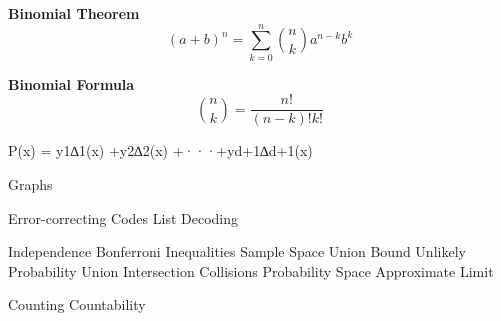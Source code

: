 \documentclass{article}\usepackage{amsmath,amssymb,amsthm,tikz,tkz-graph,color,chngpage,soul,hyperref,csquotes,graphicx,floatrow, listings,polynom}\newcommand*{\QEDB}{\hfill\ensuremath{\square}}\newtheorem*{prop}{Proposition}\renewcommand{\theenumi}{\alph{enumi}}\usepackage[shortlabels]{enumitem}\usepackage[nobreak=true]{mdframed}\usetikzlibrary{matrix,calc}\MakeOuterQuote{"}\usepackage[margin=0.75in]{geometry} \newtheorem{theorem}{Theorem}\newcommand{\Z}{\mathbb Z}\newcommand{\R}{\mathbb R}\newcommand{\Q}{\mathbb Q}\newcommand{\N}{\mathbb N}\newcommand{\x}[1]{\textrm{ #1 }}\newcommand{\pr}{\textrm{Pr}}
\newcommand{\sumlim}[3]{\sum\limits_{#1}^{#2}#3}
\newcommand{\eq}[1]{\begin{equation}#1\end{equation}}
\begin{document}
\begin{mdframed}
\textbf{Binomial Theorem}
\eq{(a+b)^n=\sumlim{k=0}{n}{\binom{n}{k}a^{n-k}b^k}}
\end{mdframed}
\begin{mdframed}
\textbf{Binomial Formula}
\eq{\binom{n}{k}=\frac{n!}{(n-k)!k!}}
\end{mdframed}

P(x) = y1∆1(x) +y2∆2(x) +···+yd+1∆d+1(x)

Graphs

Error-correcting Codes
List Decoding

Independence
Bonferroni Inequalities
Sample Space
Union Bound
Unlikely Probability
Union
Intersection
Collisions
Probability Space
Approximate Limit

Counting
Countability


 \pagebreak

\end{document}
